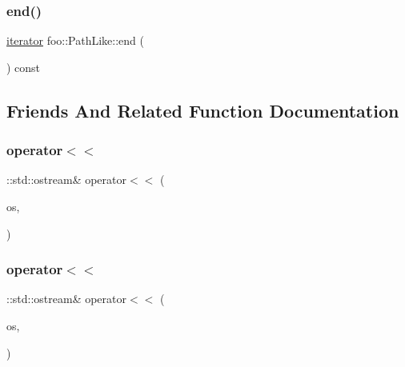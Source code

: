 \mbox{\label{classfoo_1_1_path_like_aca85cd005890f1d19f416ca7e2c95f02}} 
\subsubsection{\texorpdfstring{end()}{end()}\hspace{0.1cm}{\footnotesize\ttfamily [3/3]}}
{\footnotesize\ttfamily \mbox{\hyperlink{structfoo_1_1_path_like_1_1iterator}{iterator}} foo\+::\+Path\+Like\+::end (\begin{DoxyParamCaption}{ }\end{DoxyParamCaption}) const\hspace{0.3cm}{\ttfamily [inline]}}



\subsection{Friends And Related Function Documentation}
\mbox{\label{classfoo_1_1_path_like_ab5544a5497a8a470802bd8fcf97c49da}} 
\subsubsection{\texorpdfstring{operator$<$$<$}{operator<<}\hspace{0.1cm}{\footnotesize\ttfamily [1/3]}}
{\footnotesize\ttfamily \+::std\+::ostream\& operator$<$$<$ (\begin{DoxyParamCaption}\item[{\+::std\+::ostream \&}]{os,  }\item[{const \mbox{\hyperlink{classfoo_1_1_path_like}{Path\+Like}} \&}]{ }\end{DoxyParamCaption})\hspace{0.3cm}{\ttfamily [friend]}}

\mbox{\label{classfoo_1_1_path_like_ab5544a5497a8a470802bd8fcf97c49da}} 
\subsubsection{\texorpdfstring{operator$<$$<$}{operator<<}\hspace{0.1cm}{\footnotesize\ttfamily [2/3]}}
{\footnotesize\ttfamily \+::std\+::ostream\& operator$<$$<$ (\begin{DoxyParamCaption}\item[{\+::std\+::ostream \&}]{os,  }\item[{const \mbox{\hyperlink{classfoo_1_1_path_like}{Path\+Like}} \&}]{ }\end{DoxyParamCaption})\hspace{0.3cm}{\ttfamily [friend]}}

